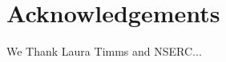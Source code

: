 \documentclass[12pt]{ecology}
\begin{document}






\section*{Acknowledgements}

We Thank Laura Timms and NSERC...



\end{document}
